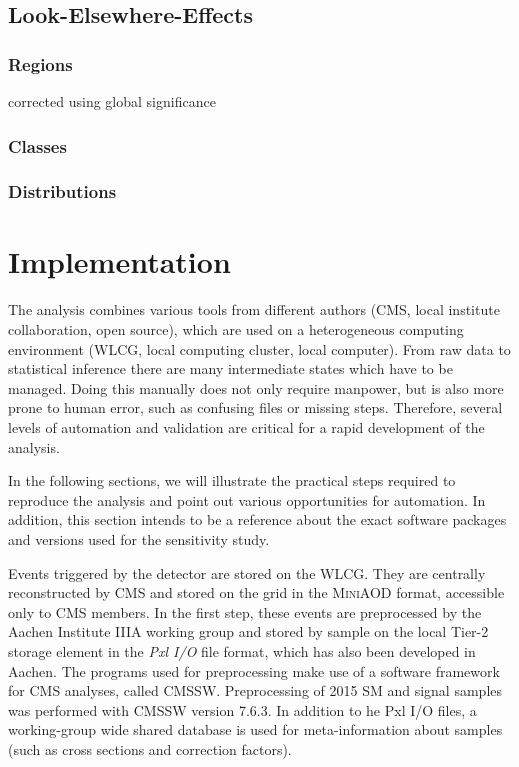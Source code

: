 \subsection{Look-Elsewhere-Effects}
\subsubsection{Regions}
corrected using global significance 

\subsubsection{Classes}
\subsubsection{Distributions}

\section{Implementation}
The analysis combines various tools from different authors (\ac{CMS}, local institute collaboration, open source), which are used on a heterogeneous computing environment (\ac{WLCG}, local computing cluster, local computer). From raw data to statistical inference there are many intermediate states which have to be managed. Doing this manually does not only require manpower, but is also more prone to human error, such as confusing files or missing steps. Therefore, several levels of automation and validation are critical for a rapid development of the analysis.

In the following sections, we will illustrate the practical steps required to reproduce the analysis and point out various opportunities for automation. In addition, this section intends to be a reference about the exact software packages and versions used for the sensitivity study.

Events triggered by the detector are stored on the \ac{WLCG}. They are centrally reconstructed by \ac{CMS} and stored on the grid in the \textsc{MiniAOD} format, accessible only to \ac{CMS} members. In the first step, these events are preprocessed by the Aachen Institute IIIA working group and stored by sample on the local Tier-2 storage element in the \emph{Pxl I/O} file format\cite{Bretz:DevelopmentEnvironmentVisual}, which has also been developed in Aachen. The programs used for preprocessing make use of a software framework for \ac{CMS} analyses, called \textsc{CMSSW}. Preprocessing of 2015 \ac{SM} and signal samples was performed with \textsc{CMSSW} version 7.6.3. In addition to he Pxl I/O files, a working-group wide shared database is used for meta-information about samples (such as cross sections and correction factors).

